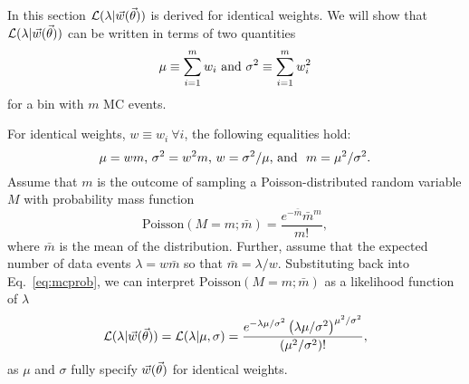 In this section $\mathcal{L}(\lambda|\vec{w}(\vec{\theta}))$ is derived for identical weights.
We will show that $\mathcal{L}(\lambda|\vec{w}(\vec{\theta}))$ can be written in terms of two quantities
\begin{equation}\label{eq:musigma}
\mu \equiv \sum_{i=1}^m w_i~\textmd{and}~\sigma^2 \equiv \sum_{i=1}^m w_i^2
\end{equation}
for a bin with $m$ MC events.

For identical weights, $w \equiv w_i~\forall i$, the following equalities hold:
\begin{equation}\label{eq:ids}
\mu=wm \textmd{,}~ \sigma^2=w^2 m \textmd{,}~ w=\sigma^2/\mu \textmd{, and }~ m = \mu^2/\sigma^2.
\end{equation}
Assume that $m$ is the outcome of sampling a Poisson-distributed random variable $M$ with probability mass function
\begin{equation}\label{eq:mcprob}
\mathrm{Poisson}(M=m;\bar m) = \frac{e^{-\bar m} {\bar m}^m}{m!},
\end{equation}
where $\bar m$ is the mean of the distribution.
Further, assume that the expected number of data events $\lambda=w \bar m$ so that $\bar m = \lambda/w$.
Substituting back into Eq.~\eqref{eq:mcprob}, we can interpret $\mathrm{Poisson}(M=m;\bar m)$ as a likelihood function of $\lambda$
\begin{equation}
\mathcal{L}(\lambda|\vec{w}(\vec{\theta}))=\mathcal{L}(\lambda|\mu, \sigma)=\frac{e^{-\lambda\mu/\sigma^2}\left(\lambda\mu/\sigma^2\right)^{\mu^2/\sigma^2}}{(\mu^2/\sigma^2)!},
\label{eq:poisson_conditional}
\end{equation}
as $\mu$ and $\sigma$ fully specify $\vec{w}(\vec{\theta})$ for identical weights.
